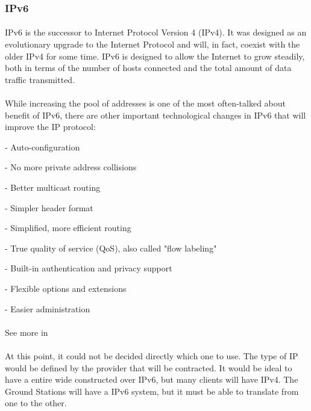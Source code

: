 \subsubsection{IPv6}
\paragraph{}
IPv6 is the successor to Internet Protocol Version 4 (IPv4). It was designed as an evolutionary upgrade to the Internet Protocol and will, in fact, coexist with the older IPv4 for some time. IPv6 is designed to allow the Internet to grow steadily, both in terms of the number of hosts connected and the total amount of data traffic transmitted.
\paragraph{}
While increasing the pool of addresses is one of the most often-talked about benefit of IPv6, there are other important technological changes in IPv6 that will improve the IP protocol:
\begin{list}{}{}
\item - Auto-configuration
\item - No more private address collisions
\item - Better multicast routing
\item - Simpler header format
\item - Simplified, more efficient routing
\item - True quality of service (QoS), also called "flow labeling"
\item - Built-in authentication and privacy support
\item - Flexible options and extensions
\item - Easier administration 
\end{list}
\paragraph{}
See more in \cite{IP_TCP_UDP}

\paragraph{}
At this point, it could not be decided directly which one to use. The type of IP would be defined by the provider that will be contracted. It would be ideal to have a entire wide constructed over IPv6, but many clients will have IPv4. The Ground Stations will have a IPv6 system, but it must be able to translate from one to the other.

